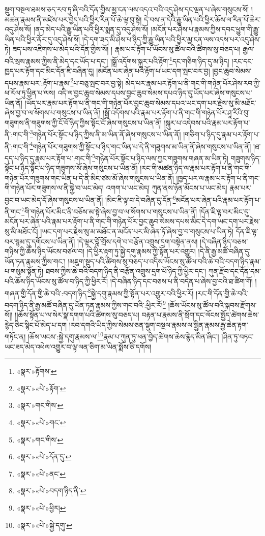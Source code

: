 སྡུག་བསྔལ་ཐམས་ཅད་རབ་ཏུ་ཞི་བའི་དོན་གྱིས་མྱ་ངན་ལས་འདའ་བའི་འདུ་ཤེས་དང་ལྡན་པ་ཞེས་གསུངས་སོ། །མཚན་རྣམས་ནི་མཛེས་པར་བྱེད་པའི་ཕྱིར་རིན་པོ་ཆེ་ལྟ་བུ་སྟེ། དེ་བས་ན་དེའི་རྒྱུ་ཡིན་པའི་ཕྱིར་ཆོས་ལ་རིན་པོ་ཆེར་འདུ་ཤེས་སོ། །ནད་མེད་པའི་རྒྱུ་ཡིན་པའི་ཕྱིར་སྨན་དུ་འདུ་ཤེས་སོ། །མངོན་པར་ཤེས་པ་རྣམས་ཀྱིས་དབང་ཕྱུག་གི་རྒྱུ་ཡིན་པའི་ཕྱིར་ནོར་དུ་འདུ་ཤེས་སོ། །དེ་དག་ཟད་མི་ཤེས་པ་ཉིད་ཀྱི་རྒྱུ་ཡིན་པའི་ཕྱིར་མྱ་ངན་ལས་འདས་པར་འདུ་ཤེས་ཏེ། ཟད་པས་འཇིགས་པ་མེད་པའི་དོན་གྱིས་སོ། །
རྣམ་པར་རྟོག་པ་ཡོངས་སུ་ཚོལ་བའི་ཚིགས་སུ་བཅད་པ། རྒྱལ་བའི་སྲས་རྣམས་ཀྱིས་ནི་མེད་དང་ཡོད་པ་དང་། །སྒྲོ་འདོགས་སྐུར་པའི་རྟོག་\footnote{«སྣར་»རྟོགས་}དང་གཅིག་ཉིད་དུ་མ་ཉིད། །རང་དང་ཁྱད་པར་རྟོག་དང་མིང་དོན་ཇི་བཞིན་དུ། །མངོན་པར་ཞེན་པའི་རྟོག་པ་ཡང་དག་སྤང་བར་བྱ། །བྱང་ཆུབ་སེམས་དཔས་རྣམ་པར་:རྟོག་པ་རྣམ་\footnote{«སྣར་»«པེ་»རྟོག་}པ་བཅུ་སྤང་བར་བྱ་སྟེ། མེད་པར་རྣམ་པར་རྟོག་པ་ནི་གང་གི་གཉེན་པོར་ཤེས་རབ་ཀྱི་ཕ་རོལ་ཏུ་ཕྱིན་པ་ལས། འདི་ལ་བྱང་ཆུབ་སེམས་དཔས་བྱང་ཆུབ་སེམས་དཔའ་ཉིད་དུ་ཡོད་པར་ཞེས་གསུངས་པ་ཡིན་ནོ། །ཡོད་པར་རྣམ་པར་རྟོག་པ་ནི་གང་གི་གཉེན་པོར་བྱང་ཆུབ་སེམས་དཔའ་ཡང་དག་པར་རྗེས་སུ་མི་མཐོང་ཞེས་བྱ་བ་ལ་སོགས་པ་གསུངས་པ་ཡིན་ནོ། །སྒྲོ་འདོགས་པའི་རྣམ་པར་རྟོག་པ་ནི་གང་གི་གཉེན་པོར་ཤཱ་རིའི་བུ་གཟུགས་ནི་གཟུགས་ཀྱི་ངོ་བོ་ཉིད་ཀྱིས་སྟོང་ངོ་ཞེས་གསུངས་པ་ཡིན་ནོ། །སྐུར་པ་འདེབས་པའི་རྣམ་པར་རྟོག་པ་ནི་:གང་གི་\footnote{«སྣར་»གང་གིས་}གཉེན་པོར་སྟོང་པ་ཉིད་ཀྱིས་ནི་མ་ཡིན་ནོ་ཞེས་གསུངས་པ་ཡིན་ནོ། །གཅིག་པ་ཉིད་དུ་རྣམ་པར་རྟོག་པ་ནི་:གང་གི་\footnote{«སྣར་»«པེ་»གང་}གཉེན་པོར་གཟུགས་ཀྱི་སྟོང་པ་ཉིད་གང་ཡིན་པ་དེ་ནི་གཟུགས་མ་ཡིན་ནོ་ཞེས་གསུངས་པ་ཡིན་ནོ། །ཐ་དད་པ་ཉིད་དུ་རྣམ་པར་རྟོག་པ་:གང་གི་\footnote{«སྣར་»གང་གིས་}གཉེན་པོར་སྟོང་པ་ཉིད་ལས་ཀྱང་གཟུགས་གཞན་མ་ཡིན་ཏེ། གཟུགས་ཉིད་སྟོང་པ་ཉིད་སྟོང་པ་ཉིད་གཟུགས་སོ་ཞེས་གསུངས་པ་ཡིན་ནོ། །རང་གི་མཚན་ཉིད་ལ་རྣམ་པར་རྟོག་པ་ནི་གང་གི་གཉེན་པོར་གཟུགས་གང་ཡིན་པ་དེ་ནི་མིང་ཙམ་མོ་ཞེས་གསུངས་པ་ཡིན་ནོ། །ཁྱད་པར་ལ་རྣམ་པར་རྟོག་པ་ནི་གང་གི་གཉེན་པོར་གཟུགས་ལ་ནི་སྐྱེ་བ་ཡང་མེད། འགག་པ་ཡང་མེད། ཀུན་ནས་ཉོན་མོངས་པ་ཡང་མེད། རྣམ་པར་བྱང་བ་ཡང་མེད་དོ་ཞེས་གསུངས་པ་ཡིན་ནོ། །མིང་ཇི་ལྟ་བ་དེ་བཞིན་དུ་དོན་\footnote{«སྣར་»«པེ་»དོན་དུ་}མངོན་པར་ཞེན་པའི་རྣམ་པར་རྟོག་པ་ནི་གང་\footnote{«སྣར་»«པེ་»ནང་}གི་གཉེན་པོར་མིང་ནི་བཅོས་མ་སྟེ་ཞེས་བྱ་བ་ལ་སོགས་པ་གསུངས་པ་ཡིན་ནོ། །དོན་ཇི་ལྟ་བར་མིང་དུ་མངོན་པར་ཞེན་པའི་རྣམ་པར་རྟོག་པ་ནི་གང་གི་གཉེན་པོར་བྱང་ཆུབ་སེམས་དཔས་མིང་དེ་དག་ཡང་དག་པར་རྗེས་སུ་མི་མཐོང་ངོ། །ཡང་དག་པར་རྗེས་སུ་མ་མཐོང་ན་མངོན་པར་མི་ཞེན་ཏོ་ཞེས་བྱ་བ་གསུངས་པ་ཡིན་ཏེ། དོན་ཇི་ལྟ་བར་སྙམ་དུ་དགོངས་པ་ཡིན་ནོ། །དེ་ལྟར་བློ་གྲོས་དགེ་བ་བརྩོན་འགྲུས་དྲག་བསྟེན་ནས། །དེ་བཞིན་ཉིད་བཅས་གཉིས་ཀྱི་ཆོས་ཉིད་ཡོངས་བཙལ་བ། །དེ་ཕྱིར་རྟག་ཏུ་སྐྱེ་དགུ་རྣམས་ཀྱི་སྟོན་པར་འགྱུར། །དེ་ནི་རྒྱ་མཚོ་བཞིན་དུ་ཡོན་ཏན་རྣམས་ཀྱིས་གང་། །མཇུག་སྡུད་པའི་ཚིགས་སུ་བཅད་པ་འདིས་ཡོངས་སུ་ཚོལ་བའི་ཆེ་བའི་བདག་ཉིད་རྣམ་པ་གསུམ་སྟོན་ཏེ། ཐབས་ཀྱིས་ཆེ་བའི་བདག་ཉིད་ནི་བརྩོན་འགྲུས་དྲག་པོ་ཉིད་ཀྱི་ཕྱིར་དང་། ཀུན་རྫོབ་དང་དོན་དམ་པའི་ཆོས་ཉིད་ཡོངས་སུ་ཚོལ་བ་ཉིད་ཀྱི་ཕྱིར་རོ། །དེ་བཞིན་ཉིད་དང་བཅས་པ་ནི་བདེན་པ་ཞེས་བྱ་བའི་ཐ་ཚིག་གོ། །གཞན་གྱི་དོན་གྱི་ཆེ་བའི་:བདག་ཉིད་\footnote{«སྣར་»«པེ་»བདག་ཉིད་ནི་}སྐྱེ་དགུ་རྣམས་ཀྱི་སྟོན་པར་འགྱུར་བའི་ཕྱིར་རོ། །རང་གི་དོན་གྱི་ཆེ་བའི་བདག་ཉིད་ནི་རྒྱ་མཚོ་བཞིན་དུ་ཡོན་ཏན་རྣམས་ཀྱིས་གང་བའི་:ཕྱིར་རོ།\footnote{«སྣར་»«པེ་»ཕྱིར།} །ཆོས་ཡོངས་སུ་ཚོལ་བའི་སྐབས་རྫོགས་སོ།། །།ཆོས་སྟོན་པ་ལ་སེར་སྣ་དགག་པའི་ཚིགས་སུ་བཅད་པ། བརྟན་པ་རྣམས་ནི་སྲོག་དང་ལོངས་སྤྱོད་ཚེགས་ཆེས་རྙེད་ཅིང་སྙིང་པོ་མེད་པ་དག །རབ་དགའི་ཡིད་ཀྱིས་སེམས་ཅན་སྡུག་བསྔལ་རྣམས་ལ་སྦྱིན་རྣམས་རྒྱ་ཆེན་རྟག་གཏོང་ན། །ཆོས་ཡངས་:སྐྱེ་དགུ་རྣམས་ལ་\footnote{«སྣར་»«པེ་»སྐྱེ་དགུ་}རྣམ་པ་ཀུན་ཏུ་ཕན་བྱེད་ཚེགས་ཆེས་རྙེད་མིན་ཞིང་། །ཤིན་ཏུ་བཏང་ཡང་ཟད་མེད་འཕེལ་འགྱུར་བ་ལྟ་ལན་ཅིག་མ་ཡིན་སྨོས་ཅི་དགོས། 